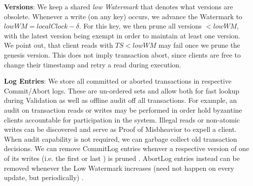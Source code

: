 \textbf{Versions}: We keep a shared \textit{low Watermark} that denotes what versions are obsolete. Whenever  a write (on any key) occurs, we advance the Watermark to $lowWM = localClock - \delta$. For this key, we then prune all versions $< lowWM$, with the latest version being exempt in order to maintain at least one version.  We point out, that client reads with $TS < lowWM$ may fail once we prune the genesis version. This does not imply transaction abort, since clients are free to change their timestamp and retry a read during execution.

\textbf{Log Entries}: We store all committed or aborted transactions in respective Commit/Abort logs. These are un-ordered sets and allow both for fast lookup during Validation as well as offline audit off all transactions. For example, an audit on transaction reads or writes may be performed in order hold byzantine clients accountable for participation in the system. Illegal reads or non-atomic writes can be discovered and serve as Proof of Misbheavior to expell a client. When audit capability is not required, we can garbage collect old transaction decisions. We can remove CommitLog entries whenver a respective version of one of its writes (i.e. the first  or last ) is pruned . AbortLog entries instead can be removed whenever the Low Watermark increases (need not happen on every update, but periodically) . 


